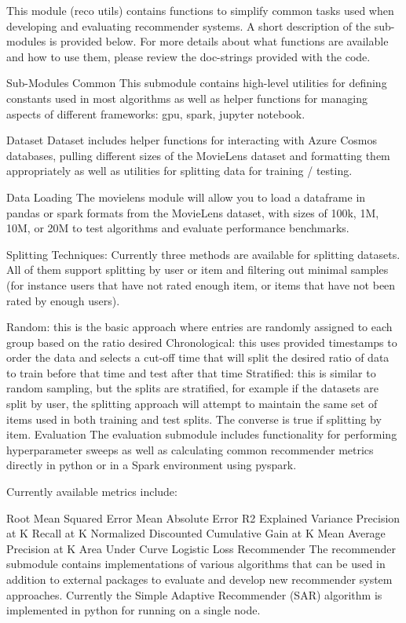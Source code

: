 This module (reco utils) contains functions to simplify common tasks used when developing and evaluating recommender systems. A short description of the sub-modules is provided below. For more details about what functions are available and how to use them, please review the doc-strings provided with the code.

Sub-Modules
Common
This submodule contains high-level utilities for defining constants used in most algorithms as well as helper functions for managing aspects of different frameworks: gpu, spark, jupyter notebook.

Dataset
Dataset includes helper functions for interacting with Azure Cosmos databases, pulling different sizes of the MovieLens dataset and formatting them appropriately as well as utilities for splitting data for training / testing.

Data Loading
The movielens module will allow you to load a dataframe in pandas or spark formats from the MovieLens dataset, with sizes of 100k, 1M, 10M, or 20M to test algorithms and evaluate performance benchmarks.

Splitting Techniques:
Currently three methods are available for splitting datasets. All of them support splitting by user or item and filtering out minimal samples (for instance users that have not rated enough item, or items that have not been rated by enough users).

Random: this is the basic approach where entries are randomly assigned to each group based on the ratio desired
Chronological: this uses provided timestamps to order the data and selects a cut-off time that will split the desired ratio of data to train before that time and test after that time
Stratified: this is similar to random sampling, but the splits are stratified, for example if the datasets are split by user, the splitting approach will attempt to maintain the same set of items used in both training and test splits. The converse is true if splitting by item.
Evaluation
The evaluation submodule includes functionality for performing hyperparameter sweeps as well as calculating common recommender metrics directly in python or in a Spark environment using pyspark.

Currently available metrics include:

Root Mean Squared Error
Mean Absolute Error
R2
Explained Variance
Precision at K
Recall at K
Normalized Discounted Cumulative Gain at K
Mean Average Precision at K
Area Under Curve
Logistic Loss
Recommender
The recommender submodule contains implementations of various algorithms that can be used in addition to external packages to evaluate and develop new recommender system approaches. Currently the Simple Adaptive Recommender (SAR) algorithm is implemented in python for running on a single node.
